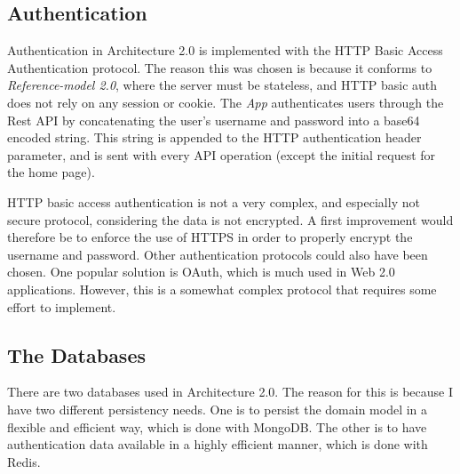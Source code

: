 \subsection{Authentication}
Authentication in Architecture 2.0 is implemented with the HTTP Basic Access Authentication protocol\cite{httpauth}. The reason this was chosen is because it conforms to \textit{Reference-model 2.0}, where the server must be stateless, and HTTP basic auth does not rely on any session or cookie. The \textit{App} authenticates users through the Rest API by concatenating the user's username and password into a base64 encoded string. This string is appended to the HTTP authentication header parameter, and is sent with every API operation (except the initial request for the home page).

HTTP basic access authentication is not a very complex, and especially not secure protocol, considering the data is not encrypted. A first improvement would therefore be to enforce the use of HTTPS in order to properly encrypt the username and password. Other authentication protocols could also have been chosen. One popular solution is OAuth\cite{oauth}, which is much used in Web 2.0 applications. However, this is a somewhat complex protocol that requires some effort to implement.

\subsection{The Databases}
There are two databases used in Architecture 2.0. The reason for this is because I have two different persistency needs. One is to persist the domain model in a flexible and efficient way, which is done with MongoDB. The other is to have authentication data available in a highly efficient manner, which is done with Redis.

